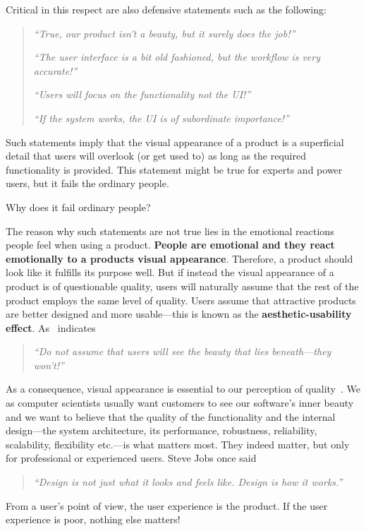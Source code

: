 Critical in this respect are also defensive statements such as the following:
\begin{quote}
	\emph{``True, our product isn't a beauty, but it surely does the job!''}
	\par
	\emph{``The user interface is a bit old fashioned, but the workflow is very accurate!''}
	\par
	\emph{``Users will focus on the functionality not the UI!''}
	\par
	\emph{``If the system works, the UI is of subordinate importance!''}
\end{quote}
Such statements imply that the visual appearance of a product is a superficial detail that users will overlook (or get used to) as long as the required functionality is provided. 
This statement might be true for experts and power users, but it fails the ordinary people.

Why does it fail ordinary people?

The reason why such statements are not true lies in the emotional reactions people feel when using a product. \textbf{People are emotional and they react emotionally to a products visual appearance}. 
Therefore, a product should look like it fulfills its purpose well.
But if instead the visual appearance of a product is of questionable quality, users will naturally assume that the rest of the product employs the same level of quality. 
Users assume that attractive products are better designed and more usable---this is known as the \textbf{aesthetic-usability effect}. As~\citep{mckay:2013} indicates 
\begin{quote}
	\emph{``Do not assume that users will see the beauty that lies beneath---they won't!''}
\end{quote}

As a consequence, visual appearance is essential to our perception of quality~.
We as computer scientists usually want customers to see our software's inner beauty and we want to believe that the quality of the functionality and the internal design---the system architecture, its performance, robustness, reliability, scalability, flexibility etc.---is what matters most. 
They indeed matter, but only for professional or experienced users.
Steve Jobs once said
\begin{quote}
	\emph{``Design is not just what it looks and feels like. Design is how it works.''}
\end{quote}
From a user's point of view, the user experience is the product.
If the user experience is poor, nothing else matters!

